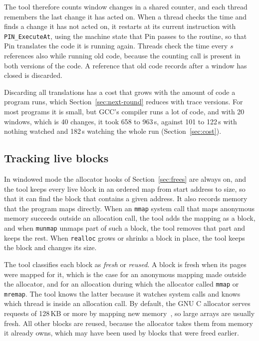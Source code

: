 \documentclass[11pt]{article}
\newcommand{\secref}[1]{Section~\ref{#1}}
\newcommand{\term}[1]{\emph{#1}}
\begin{document}
The tool therefore counts window changes in a shared counter, and each thread remembers the last change it has acted on. When a thread checks the time and finds a change it has not acted on, it restarts at its current instruction with \texttt{PIN\_ExecuteAt}, using the machine state that Pin passes to the routine, so that Pin translates the code it is running again. Threads check the time every $s$ references also while running old code, because the counting call is present in both versions of the code. A reference that old code records after a window has closed is discarded.

Discarding all translations has a cost that grows with the amount of code a program runs, which \secref{sec:next-round} reduces with trace versions. For most programs it is small, but GCC's compiler runs a lot of code, and with 20 windows, which is 40 changes, it took 658 to 963\,s, against 101 to 122\,s with nothing watched and 182\,s watching the whole run (\secref{sec:cost}).

\subsection{Tracking live blocks}
\label{sec:blocks}

In windowed mode the allocator hooks of \secref{sec:frees} are always on, and the tool keeps every live block in an ordered map from start address to size, so that it can find the block that contains a given address. It also records memory that the program maps directly. When an \texttt{mmap} system call that maps anonymous memory succeeds outside an allocation call, the tool adds the mapping as a block, and when \texttt{munmap} unmaps part of such a block, the tool removes that part and keeps the rest. When \texttt{realloc} grows or shrinks a block in place, the tool keeps the block and changes its size.

The tool classifies each block as \term{fresh} or \term{reused}. A block is fresh when its pages were mapped for it, which is the case for an anonymous mapping made outside the allocator, and for an allocation during which the allocator called \texttt{mmap} or \texttt{mremap}. The tool knows the latter because it watches system calls and knows which thread is inside an allocation call. By default, the GNU C allocator serves requests of 128\,KB or more by mapping new memory~\cite{glibcmanual}, so large arrays are usually fresh. All other blocks are reused, because the allocator takes them from memory it already owns, which may have been used by blocks that were freed earlier.
\end{document}
